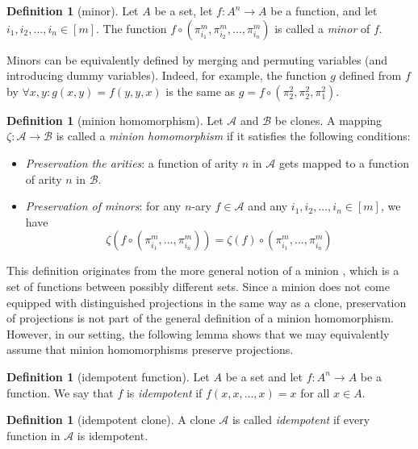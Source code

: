 \documentclass{amsart}
\numberwithin{equation}{section}
\theoremstyle{plain}
\theoremstyle{definition}
\newtheorem{definition}[theorem]{Definition}
\def\set#1{#1}
\def\clone#1{\mathcal{#1}}
\begin{document}
\begin{definition}[minor]
Let $\set{A}$ be a set, let $f\colon \set{A}^n\to \set{A}$ be a function, and let $i_1,i_2,\dots,i_n\in [m]$. The function $f\circ (\pi_{i_1}^m,\pi_{i_2}^m,\dots,\pi_{i_n}^m)$ is called a {\em minor} of $f$.
\end{definition}

Minors can be equivalently defined by merging and permuting variables (and introducing dummy variables). Indeed, for example, the function $g$ defined from $f$ by $\forall x,y: g(x,y) = f(y,y,x)$ is the same as $g = f \circ (\pi_2^2,\pi_2^2,\pi_1^2)$.

\begin{definition}[minion homomorphism]
Let $\clone{A}$ and $\clone{B}$ be clones. A mapping $\zeta\colon\clone{A}\to \clone{B}$ is called a {\em minion homomorphism} if it satisfies the following conditions:
\begin{itemize}
\item {\em Preservation the arities}: 
a function of arity $n$ in $\clone{A}$ gets mapped to a function of arity $n$ in $\clone{B}$.  
\item {\em Preservation of minors}: for any $n$-ary $f\in \clone{A}$  and any $i_1,i_2,\dots,i_n\in [m]$, we have 
$$\zeta(f\circ(\pi_{i_1}^m,\dots,\pi_{i_n}^m)) = \zeta(f)\circ(\pi_{i_1}^m,\dots,\pi_{i_n}^m) $$
\end{itemize}
\end{definition}

This definition originates from the more general notion of a minion \cite{approach}, which is a set of functions between possibly different sets. Since a minion does not come equipped with distinguished projections in the same way as a clone, preservation of projections is not part of the general definition of a minion homomorphism. However, in our setting, the following lemma shows that we may equivalently assume that minion homomorphisms preserve projections.

\begin{definition}[idempotent function]
Let $\set{A}$ be a set and let $f\colon \set{A}^n\to \set{A}$ be a function. We say that $f$ is {\em idempotent} if $f(x,x,\dots,x) = x$ for all $x\in\set{A}$.
\end{definition}

\begin{definition}[idempotent clone]
A clone $\clone{A}$ is called {\em idempotent} if every function in $ \clone{A}$ is idempotent.
\end{definition}
\end{document}

